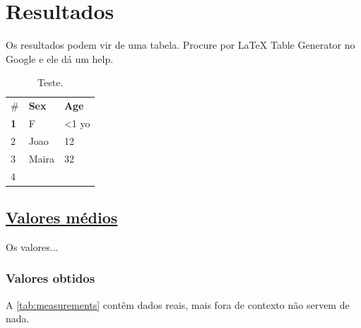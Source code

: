 \section{\textbf{Resultados}}
Os resultados podem vir de uma tabela. Procure por LaTeX Table Generator no Google e ele dá um help.

\begin{table}[]
\centering
\caption{Teste.}
\label{tab:teste}
\begin{tabular}{lll}
\hline
\multirow{2}{*}{\#} & \multirow{2}{*}{\textbf{Sex}} & \multirow{2}{*}{\textbf{Age}} \\
 &  &  \\
\textbf{1} & F & \multicolumn{1}{r}{\textless 1 yo} \\
2 & Joao & 12 \\
3 & Maira & 32 \\
4 &  & 
\end{tabular}
\end{table}

\subsection{\underline{Valores médios}}
Os valores...

\subsubsection{Valores obtidos}
A \ref{tab:measurements} contêm dados reais, mais fora de contexto não servem de nada.




